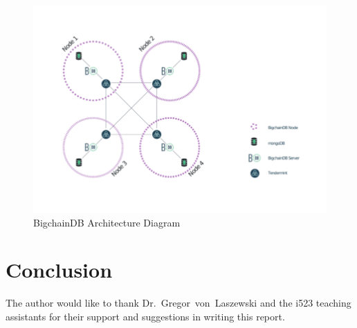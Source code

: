 \begin{figure}[!htb]
	\centering\includegraphics[width=\columnwidth]{images/bdb-arch.pdf}  
	\caption{BigchainDB Architecture Diagram~\cite{aA17}}\label{f:bdb2}
\end{figure}

\section{Conclusion}


\begin{acks}
The author would like to thank Dr.~Gregor~von~Laszewski and the i523
teaching assistants for their support and suggestions in writing this
report.
\end{acks}


 

